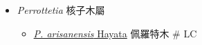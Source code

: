 
  \begin{itemize}
 \item[] \textit{Perrottetia} 核子木屬
                                
  \begin{itemize}
        \item[] \href{http://www.theplantlist.org/tpl1.1/search?q=Perrottetia+arisanensis}{\textit{P. arisanensis} Hayata}   佩羅特木  \# LC
  \end{itemize}
  \end{itemize}
